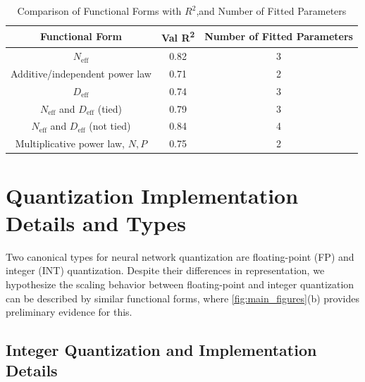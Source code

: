 \documentclass[11pt]{article}
\begin{document}
\begin{table}[ht]
\centering
\begin{tabular}{|c|c|c|}
\hline
\textbf{Functional Form} & \textbf{Val  R\textsuperscript{2}} & \textbf{Number of Fitted Parameters} \\
\hline
$N_\text{eff}$ & 0.82 & 3 \\
\hline
Additive/independent power law & 0.71 & 2 \\
\hline
$D_\text{eff}$ & 0.74 & 3 \\
\hline
$N_\text{eff}$ and $D_\text{eff}$ (tied) & 0.79 & 3 \\
\hline
$N_\text{eff}$ and $D_\text{eff}$ (not tied) & 0.84 & 4 \\
\hline
Multiplicative power law, $N, P$ & 0.75 & 2 \\
\hline
\end{tabular}
\caption{Comparison of Functional Forms with $R^2$,and Number of Fitted Parameters}
\label{table:functions}
\end{table}


\section{Quantization Implementation Details and Types}
\label{appdx:types}

Two canonical types for neural network quantization are floating-point (FP) and integer (INT) quantization. Despite their differences in representation, we hypothesize the scaling behavior between floating-point and integer quantization can be described by similar functional forms, where \ref{fig:main_figures}(b) provides preliminary evidence for this. 

\subsection{Integer Quantization and Implementation Details}
\end{document}
